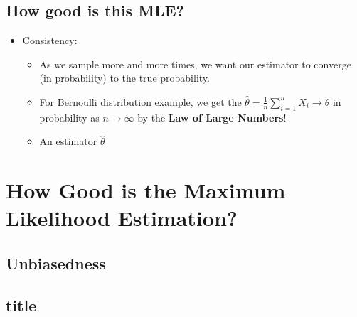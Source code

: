 \documentclass[letterpaper,10pt]{article}
\begin{document}
\subsection{How good is this MLE?}

\begin{itemize}
	\item Consistency:
	\begin{itemize}
		\item As we sample more and more times, we want our estimator to converge (in probability) to the true probability.
		\item For Bernoulli distribution example, we get the $\hat{\theta}=\frac{1}{n}\sum_{i=1}^{n}{X_i} \rightarrow \theta$ in probability as $n \rightarrow \infty$ by the \textbf{Law of Large Numbers}!
		\item An estimator $\hat{\theta}$
	\end{itemize}
\end{itemize}

\section{How Good is the Maximum Likelihood Estimation?}

\subsection{Unbiasedness}

\subsection{title}

	
\end{document}
